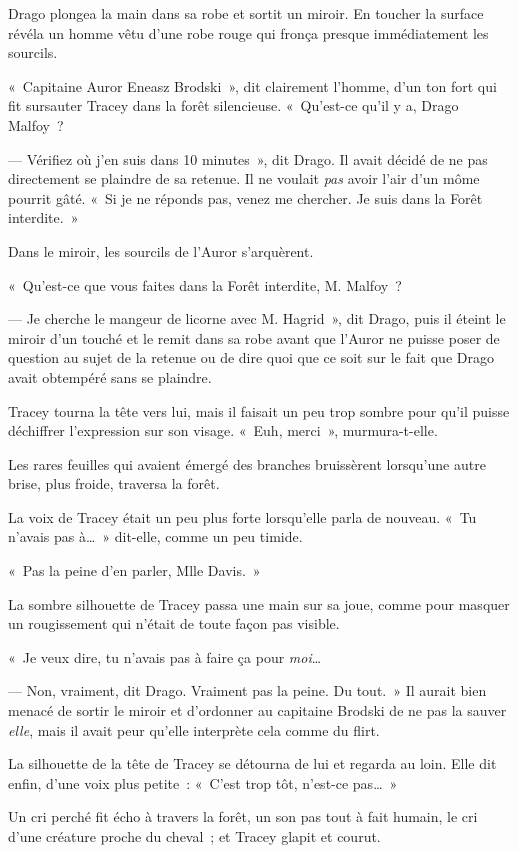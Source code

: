 Drago plongea la main dans sa robe et sortit un miroir.
En toucher la surface révéla un homme vêtu d'une robe rouge qui fronça presque immédiatement les sourcils.

«~Capitaine Auror Eneasz Brodski~», dit clairement l'homme, d'un ton fort qui fit sursauter Tracey dans la forêt silencieuse.
«~Qu'est-ce qu'il y a, Drago Malfoy~?

--- Vérifiez où j'en suis dans 10 minutes~», dit Drago.
Il avait décidé de ne pas directement se plaindre de sa retenue.
Il ne voulait \emph{pas} avoir l'air d'un môme pourrit gâté.
«~Si je ne réponds pas, venez me chercher.
Je suis dans la Forêt interdite.~»

Dans le miroir, les sourcils de l'Auror s'arquèrent.

«~Qu'est-ce que vous faites dans la Forêt interdite, M. Malfoy~?

--- Je cherche le mangeur de licorne avec M. Hagrid~», dit Drago, puis il éteint le miroir d'un touché et le remit dans sa robe avant que l'Auror ne puisse poser de question au sujet de la retenue ou de dire quoi que ce soit sur le fait que Drago avait obtempéré sans se plaindre.

Tracey tourna la tête vers lui, mais il faisait un peu trop sombre pour qu'il puisse déchiffrer l'expression sur son visage.
«~Euh, merci~», murmura-t-elle.

Les rares feuilles qui avaient émergé des branches bruissèrent lorsqu'une autre brise, plus froide, traversa la forêt.

La voix de Tracey était un peu plus forte lorsqu'elle parla de nouveau.
«~Tu n'avais pas à…~»
dit-elle, comme un peu timide.

«~Pas la peine d'en parler, Mlle Davis.~»

La sombre silhouette de Tracey passa une main sur sa joue, comme pour masquer un rougissement qui n'était de toute façon pas visible.

«~Je veux dire, tu n'avais pas à faire ça pour \emph{moi}…

--- Non, vraiment, dit Drago.
Vraiment pas la peine.
Du tout.~»
Il aurait bien menacé de sortir le miroir et d'ordonner au capitaine Brodski de ne pas la sauver \emph{elle}, mais il avait peur qu'elle interprète cela comme du flirt.

La silhouette de la tête de Tracey se détourna de lui et regarda au loin.
Elle dit enfin, d'une voix plus petite~: «~C'est trop tôt, n'est-ce pas…~»

Un cri perché fit écho à travers la forêt, un son pas tout à fait humain, le cri d'une créature proche du cheval~; et Tracey glapit et courut.

